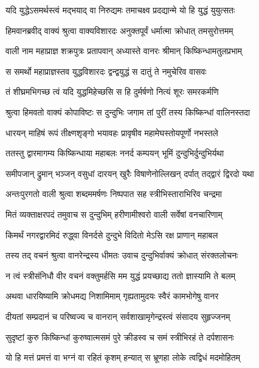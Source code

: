\twolineshloka
{यदि युद्धेऽसमर्थस्त्वं मद्भयाद् वा निरुद्यमः}
{तमाचक्ष्व प्रदद्यान्मे यो हि युद्धं युयुत्सतः} %

\twolineshloka
{हिमवानब्रवीद् वाक्यं श्रुत्वा वाक्यविशारदः}
{अनुक्तपूर्वं धर्मात्मा क्रोधात् तमसुरोत्तमम्} %

\twolineshloka
{वाली नाम महाप्राज्ञ शक्रपुत्रः प्रतापवान्}
{अध्यास्ते वानरः श्रीमान् किष्किन्धामतुलप्रभाम्} %

\twolineshloka
{स समर्थो महाप्राज्ञस्तव युद्धविशारदः}
{द्वन्द्वयुद्धं स दातुं ते नमुचेरिव वासवः} %

\twolineshloka
{तं शीघ्रमभिगच्छ त्वं यदि युद्धमिहेच्छसि}
{स हि दुर्मर्षणो नित्यं शूरः समरकर्मणि} %

\twolineshloka
{श्रुत्वा हिमवतो वाक्यं कोपाविष्टः स दुन्दुभिः}
{जगाम तां पुरीं तस्य किष्किन्धां वालिनस्तदा} %

\twolineshloka
{धारयन् माहिषं रूपं तीक्ष्णशृङ्गो भयावहः}
{प्रावृषीव महामेघस्तोयपूर्णो नभस्तले} %

\twolineshloka
{ततस्तु द्वारमागम्य किष्किन्धाया महाबलः}
{ननर्द कम्पयन् भूमिं दुन्दुभिर्दुन्दुभिर्यथा} %

\twolineshloka
{समीपजान् द्रुमान् भञ्जन् वसुधां दारयन् खुरैः}
{विषाणेनोल्लिखन् दर्पात् तद्द्वारं द्विरदो यथा} %

\twolineshloka
{अन्तःपुरगतो वाली श्रुत्वा शब्दममर्षणः}
{निष्पपात सह स्त्रीभिस्ताराभिरिव चन्द्रमा} %

\twolineshloka
{मितं व्यक्ताक्षरपदं तमुवाच स दुन्दुभिम्}
{हरीणामीश्वरो वाली सर्वेषां वनचारिणाम्} %

\twolineshloka
{किमर्थं नगरद्वारमिदं रुद्ध्वा विनर्दसे}
{दुन्दुभे विदितो मेऽसि रक्ष प्राणान् महाबल} %

\twolineshloka
{तस्य तद् वचनं श्रुत्वा वानरेन्द्रस्य धीमतः}
{उवाच दुन्दुभिर्वाक्यं क्रोधात् संरक्तलोचनः} %

\twolineshloka
{न त्वं स्त्रीसंनिधौ वीर वचनं वक्तुमर्हसि}
{मम युद्धं प्रयच्छाद्य ततो ज्ञास्यामि ते बलम्} %

\twolineshloka
{अथवा धारयिष्यामि क्रोधमद्य निशामिमाम्}
{गृह्यतामुदयः स्वैरं कामभोगेषु वानर} %

\twolineshloka
{दीयतां सम्प्रदानं च परिष्वज्य च वानरान्}
{सर्वशाखामृगेन्द्रस्त्वं संसादय सुहृज्जनम्} %

\twolineshloka
{सुदृष्टां कुरु किष्किन्धां कुरुष्वात्मसमं पुरे}
{क्रीडस्व च समं स्त्रीभिरहं ते दर्पशासनः} %

\twolineshloka
{यो हि मत्तं प्रमत्तं वा भग्नं वा रहितं कृशम्}
{हन्यात् स भ्रूणहा लोके त्वद्विधं मदमोहितम्} %

